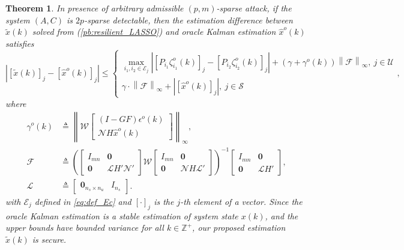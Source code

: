 \documentclass[12pt]{article}  %
\newcommand{\Zb}{{\mathbb{Z}}}
\newcommand{\Ec}{{\mathcal{E}}} %
\newcommand{\Fc}{{\mathcal{F}}}
\newcommand{\Uc}{{\mathcal{U}}}
\newcommand{\Sc}{{\mathcal{S}}}
\newcommand{\Nc}{{\mathcal{N}}}
\newcommand{\Wc}{{\mathcal{W}}}
\newcommand{\Lc}{{\mathcal{L}}}
\newcommand{\ift}{{\infty}}
\newtheorem{theorem}{\textbf{Theorem}}
\begin{document}
\begin{theorem}\label{th:main}
In presence of arbitrary admissible $(p,m)$-sparse attack, if the system $(A,C)$ is $2p$-sparse detectable, then 
the estimation difference between $\tilde{x}(k)$ solved from (\ref{pb:resilient_LASSO}) and oracle Kalman estimation $\hat{x}^o(k)$ satisfies
\begin{equation}\label{eq:diff_upper_bound}
\left|[\tilde{x}(k)]_j-[\hat{x}^o(k)]_j\right|\leq
\begin{cases*}
\max_{i_1,i_2\in \Ec_j} \left| \left[P_{i_1} \zeta^o_{i_1}(k)\right]_j- \left[P_{i_2} \zeta^o_{i_2}(k)\right]_j\right| + \left(\gamma+\gamma^o(k) \right) \left\|\Fc\right\|_\ift ,\ j\in\Uc\\\gamma \cdot \left\|\Fc\right\|_\ift+\left| [\hat{x}^o(k)]_j \right|,\ j\in\Sc
\end{cases*},
\end{equation}
where
\begin{align*}
	\gamma^o(k)&\triangleq \left\|\Wc \begin{bmatrix}
	\left(I-GF\right)\epsilon^o(k) \\
	\Nc H \hat{x}^o(k)
	\end{bmatrix}\right\|_\ift,\\
	\Fc	&\triangleq
	\left(
	\begin{bmatrix}
	I_{mn} & \mathbf{0} \\
	\mathbf{0}  &  \Lc H{'} \Nc{'}
	\end{bmatrix}
	\Wc
	\begin{bmatrix}
	I_{mn} & \mathbf{0} \\
	\mathbf{0}  &  \Nc H \Lc{'}
	\end{bmatrix}
	\right)^{-1}
	\begin{bmatrix}
	I_{mn} & \mathbf{0} \\ \mathbf{0} &\Lc H{'}
	\end{bmatrix},\\
	\Lc&\triangleq 
	\begin{bmatrix}
	\mathbf{0}_{n_s\times n_u} & I_{n_s}
	\end{bmatrix}.
\end{align*}
with $\Ec_j$ defined in \eqref{eq:def_Ec} and $[\cdot]_j$ is the $j$-th element of a vector.
Since the oracle Kalman estimation is a stable estimation of system state $x(k)$, and the upper bounds have bounded variance for all $k\in\Zb^+$, our proposed estimation $\tilde{x}(k)$ is secure. 		
\end{theorem}
\end{document}
